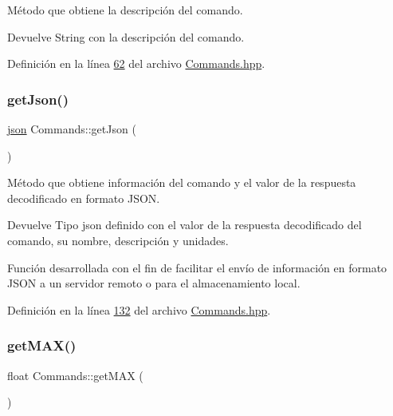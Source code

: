 Método que obtiene la descripción del comando. 

\begin{DoxyReturn}{Devuelve}
String con la descripción del comando. 
\end{DoxyReturn}


Definición en la línea \hyperlink{Commands_8hpp_source_l00062}{62} del archivo \hyperlink{Commands_8hpp_source}{Commands.\+hpp}.

\mbox{\label{classCommands_a0359da788a50c6aad69153dc0f2644e4}} 
\subsubsection{\texorpdfstring{get\+Json()}{getJson()}}
{\footnotesize\ttfamily \hyperlink{Commands_8hpp_ab701e3ac61a85b337ec5c1abaad6742d}{json} Commands\+::get\+Json (\begin{DoxyParamCaption}{ }\end{DoxyParamCaption})\hspace{0.3cm}{\ttfamily [inline]}}



Método que obtiene información del comando y el valor de la respuesta decodificado en formato J\+S\+ON. 

\begin{DoxyReturn}{Devuelve}
Tipo json definido con el valor de la respuesta decodificado del comando, su nombre, descripción y unidades.
\end{DoxyReturn}
Función desarrollada con el fin de facilitar el envío de información en formato J\+S\+ON a un servidor remoto o para el almacenamiento local. 

Definición en la línea \hyperlink{Commands_8hpp_source_l00132}{132} del archivo \hyperlink{Commands_8hpp_source}{Commands.\+hpp}.

\mbox{\label{classCommands_afbad1051313d0cdecba276384cb7fc6b}} 
\subsubsection{\texorpdfstring{get\+M\+A\+X()}{getMAX()}}
{\footnotesize\ttfamily float Commands\+::get\+M\+AX (\begin{DoxyParamCaption}{ }\end{DoxyParamCaption})\hspace{0.3cm}{\ttfamily [inline]}}



